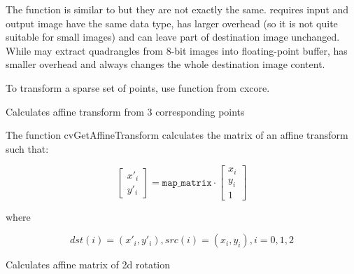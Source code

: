 The function is similar to  but they are not exactly the same.  requires input and output image have the same data type, has larger overhead (so it is not quite suitable for small images) and can leave part of destination image unchanged. While  may extract quadrangles from 8-bit images into floating-point buffer, has smaller overhead and always changes the whole destination image content.

To transform a sparse set of points, use  function from cxcore.

\label{GetAffineTransform}

Calculates affine transform from 3 corresponding points


\begin{description}
\end{description}

The function cvGetAffineTransform calculates the matrix of an affine transform such that:

\[
\begin{bmatrix}
x'_i\\
y'_i
\end{bmatrix}
=
\texttt{map\_matrix}
\cdot
\begin{bmatrix}
x_i\\
y_i\\
1
\end{bmatrix}
\]

where

\[
dst(i)=(x'_i,y'_i),
src(i)=(x_i, y_i),
i=0,1,2
\]

\label{2DRotationMatrix}

Calculates affine matrix of 2d rotation


